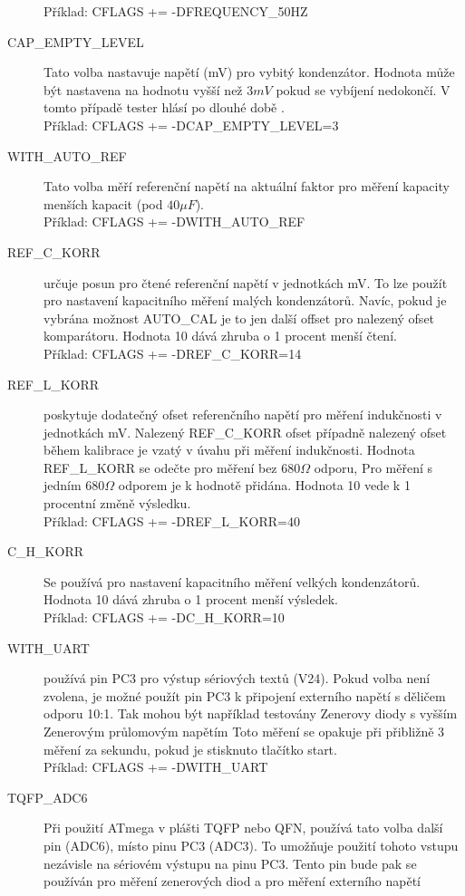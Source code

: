 \begin{description}
Příklad: CFLAGS += -DFREQUENCY\_50HZ
  \item[CAP\_EMPTY\_LEVEL] Tato volba nastavuje napětí (mV) pro vybitý kondenzátor.
Hodnota může být nastavena na hodnotu vyšší než \(3mV\) pokud se vybíjení nedokončí.
V tomto případě tester hlásí po dlouhé době .\\
Příklad: CFLAGS += -DCAP\_EMPTY\_LEVEL=3
  \item[WITH\_AUTO\_REF] Tato volba měří referenční napětí na aktuální faktor pro měření kapacity
menších kapacit (pod \(40\mu F\)).\\
Příklad: CFLAGS += -DWITH\_AUTO\_REF
  \item[REF\_C\_KORR] určuje posun pro čtené referenční napětí v jednotkách mV.
To lze použít pro nastavení kapacitního měření malých kondenzátorů.
Navíc, pokud je vybrána možnost AUTO\_\discretionary{}{}{}CAL je to jen další offset pro
nalezený ofset komparátoru.
Hodnota 10 dává zhruba o 1 procent menší čtení.\\
Příklad: CFLAGS += -DREF\_C\_KORR=14
  \item[REF\_L\_KORR] poskytuje dodatečný ofset referenčního napětí pro měření indukčnosti
v jednotkách mV. Nalezený REF\_C\_KORR ofset případně nalezený ofset během kalibrace
je vzatý v úvahu při měření indukčnosti.
Hodnota REF\_L\_KORR se odečte pro měření bez \(680\Omega\) odporu,
Pro měření s jedním \(680\Omega\) odporem je  k hodnotě přidána.
Hodnota 10 vede k 1 procentní změně výsledku.\\
Příklad: CFLAGS += -DREF\_L\_KORR=40
  \item[C\_H\_KORR] Se používá pro nastavení kapacitního měření velkých kondenzátorů.
Hodnota 10 dává zhruba o 1 procent menší výsledek.\\
Příklad: CFLAGS += -DC\_H\_KORR=10
  \item[WITH\_UART] používá pin PC3 pro výstup sériových textů (V24). Pokud volba není zvolena,
je možné použít pin PC3 k připojení externího napětí s děličem odporu 10:1.
Tak mohou být například testovány Zenerovy diody s vyšším Zenerovým průlomovým napětím
Toto měření se opakuje při přibližně 3 měření za sekundu, pokud je stisknuto tlačítko start.\\
Příklad: CFLAGS += -DWITH\_UART
  \item[TQFP\_ADC6] Při použití ATmega v plášti TQFP nebo QFN, používá tato volba další pin (ADC6),
místo pinu PC3 (ADC3).
To umožňuje použití tohoto vstupu nezávisle na sériovém výstupu na pinu PC3.
Tento pin bude pak se používán pro měření zenerových diod a pro měření externího napětí

\end{description}
